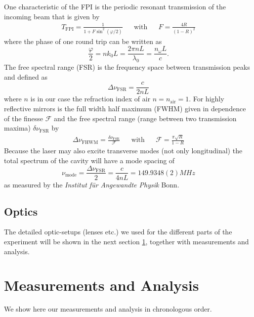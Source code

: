 \documentclass[11pt,a4paper,notitlepage]{scrartcl}
\begin{document}
 One characteristic of the FPI is the periodic resonant transmission of the incoming beam that is given by
 \begin{align}
 	T_{\text{FPI}}=\frac{1}{1+F\sin^2({\varphi/2})} &&\text{with}&&F=\frac{4R}{(1-R)^2}
 \end{align}
where the phase of one round trip can be written as 
$$\frac{\varphi}{2}=nk_0L=\frac{2\pi n L}{\lambda_0}=\frac{n_\omega L}{c}.$$
The free spectral range (FSR) is the frequency space between transmission peaks and defined as
\begin{equation}
	\Delta \nu_{\text{FSR}}=\frac{c}{2nL}
\end{equation}
where $n$ is in our case the refraction index of air $n=n_\text{air}=1$. For highly reflective mirrors is the full width half maximum (FWHM) given in dependence of the finesse $\mathcal{F}$ and the free spectral range (range between two transmission maxima) $\delta\nu_\text{FSR}$ by
\begin{align}
	\Delta\nu_\text{FHWM}=\frac{\delta \nu_\text{FSR}}{\mathcal{F}} &&\text{with}&&\mathcal{F}=\frac{\pi\sqrt{R}}{1-R}
	\label{eq:finesse}
\end{align}
Because the laser may also excite transverse modes (not only longitudinal) the total spectrum of the cavity will have a mode spacing of 
\begin{equation}
	\nu_\text{mode}=\frac{\Delta \nu_{\text{FSR}}}{2}=\frac{c}{4nL}=149.9348(2)MHz
	\label{eq:calib}
\end{equation}
as measured by the \emph{Institut für Angewandte Physik} Bonn. \cite{manual}
\subsection{Optics}
The detailed optic-setups (lenses etc.) we used for the different parts of the experiment will be shown in the next section \ref{sec:anal}, together with measurements and analysis.
\newpage
\section{Measurements and Analysis}
\label{sec:anal}
We show here our measurements and analysis in chronologous order.
\end{document}
